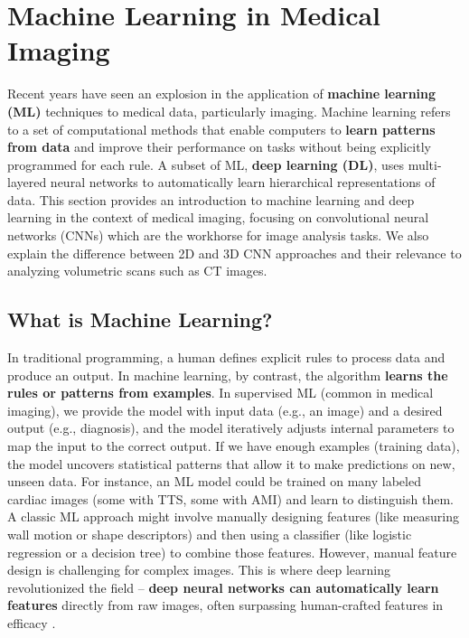 \documentclass[12pt, BSc]{muthesis}
\begin{document}
\section{Machine Learning in Medical Imaging}

Recent years have seen an explosion in the application of \textbf{machine learning (ML)} techniques to medical data, particularly imaging. Machine learning refers to a set of computational methods that enable computers to \textbf{learn patterns from data} and improve their performance on tasks without being explicitly programmed for each rule. A subset of ML, \textbf{deep learning (DL)}, uses multi-layered neural networks to automatically learn hierarchical representations of data. This section provides an introduction to machine learning and deep learning in the context of medical imaging, focusing on convolutional neural networks (CNNs) which are the workhorse for image analysis tasks. We also explain the difference between 2D and 3D CNN approaches and their relevance to analyzing volumetric scans such as CT images.

\subsection{What is Machine Learning?}

In traditional programming, a human defines explicit rules to process data and produce an output. In machine learning, by contrast, the algorithm \textbf{learns the rules or patterns from examples}. In supervised ML (common in medical imaging), we provide the model with input data (e.g., an image) and a desired output (e.g., diagnosis), and the model iteratively adjusts internal parameters to map the input to the correct output. If we have enough examples (training data), the model uncovers statistical patterns that allow it to make predictions on new, unseen data. For instance, an ML model could be trained on many labeled cardiac images (some with TTS, some with AMI) and learn to distinguish them. A classic ML approach might involve manually designing features (like measuring wall motion or shape descriptors) and then using a classifier (like logistic regression or a decision tree) to combine those features. However, manual feature design is challenging for complex images. This is where deep learning revolutionized the field – \textbf{deep neural networks can automatically learn features} directly from raw images, often surpassing human-crafted features in efficacy \cite{lecun2015deep}.
\end{document}
